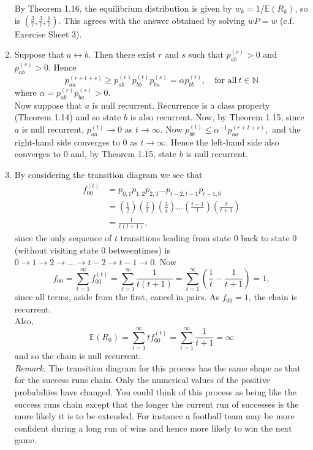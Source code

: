 \documentclass[11pt,a4paper]{article}
\begin{document}
\begin{enumerate}
        By Theorem 1.16, the equilibrium distribution is given by $w_k = 1/\mathbb{E}(R_k)$, so is $\left(\frac{3}{7}, \frac{3}{7}, \frac{1}{7}\right)$. This agrees with the answer obtained by solving $wP = w$ (c.f. Exercise Sheet 3).
        \item Suppose that $a \leftrightarrow b$. Then there exist $r$ and $s$ such that $p_{ab}^(r)>0$ and $p_{ab}^{(s)}>0$. Hence
        $$
        p_{aa}^{(r+t+s)} \geq p_{ab}^{(r)}p_{bb}^{(t)}p_{ba}^{(s)} = \alpha p_{bb}^{(t)},\quad
        \text{for all}\ t \in \mathbb{N}
        $$
        where $\alpha = p_{ab}^{(r)}p_{ba}^{(s)}>0$.\\
        Now suppose that $a$ is null recurrent. Recurrence is a class property (Theorem 1.14) and so state $b$ is also recurrent. Now, by Theorem 1.15, since $a$ is null recurrent, $p_{aa}^{(t)} \to 0$ as $t \to \infty$. Now $p_{bb}^{(t)} \leq \alpha^{-1}p_{aa}^{(r+t+s)},$ and the right-hand side converges to $0$ as $t\to \infty$. Hence the left-hand side also converges to $0$ and, by Theorem 1.15, state $b$ is null recurrent.
        \item By considering the transition diagram we see that
        \begin{align*}
            f_{00}^{(t)}
            &= p_{0,1}p_{1,2}p_{2,3}\ldots p_{t-2,t-1}p_{t-1,0}\\
            &= \left(\frac{1}{2}\right)\left(\frac{2}{3}\right)\left(\frac{3}{4}\right)\ldots \left(\frac{t-1}{t}\right)\left(\frac{t}{t+1}\right)\\
            &= \frac{1}{t(t+1)},
        \end{align*}
        since the only sequence of $t$ transitions leading from state 0 back to state 0 (without visiting state 0 betweentimes) is $0 \to 1 \to 2 \to \ldots \to t-2 \to t-1 \to 0$. Now
        $$
        f_{00} = \sum_{t=1}^\infty f_{00}^{(t)} = \sum_{t =1}^\infty \frac{1}{t(t+1)} = \sum_{t=1}^\infty \left(\frac{1}{t}-\frac{1}{t+1}\right) = 1,
        $$
        since all terms, aside from the first, cancel in pairs. As $f_{00} = 1$, the chain is recurrent.\\
        Also,
        $$
        \mathbb{E}(R_0) = \sum_{t = 1}^\infty tf_{00}^{(t)} = \sum_{t=1}^\infty \frac{1}{t+1} = \infty
        $$
        and so the chain is null recurrent.\\
        \textit{Remark.} The transition diagram for this process has the same shape as that for the success runs chain. Only the numerical values of the positive probabiliies have changed. You could think of this process as being like the success runs chain except that the longer the current run of successes is the more likely it is to be extended. For instance a football team may be more confident during a long run of wins and hence more likely to win the next game.

\end{enumerate}
\end{document}
